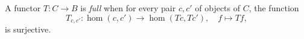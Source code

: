 A functor $T: C \rightarrow B$ is \emph{full} when for every pair $c, c'$ of objects of $C$, the function
$$T_{c, c'}: \hom(c, c') \rightarrow \hom(Tc, Tc'), \quad f \mapsto Tf,$$
is surjective.
